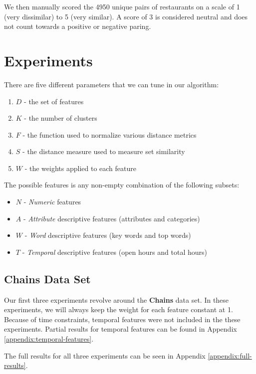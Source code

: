 \documentclass{article}
\begin{document}
      We then manually scored the 4950 unique pairs of restaurants on a scale of 1 (very dissimilar) to 5 (very similar).
      A score of 3 is considered neutral and does not count towards a positive or negative paring.

\section{Experiments}

   There are five different parameters that we can tune in our algorithm:
   \begin{enumerate}
      \item $D$ - the set of features
      \item $K$ - the number of clusters
      \item $F$ - the function used to normalize various distance metrics
      \item $S$ - the distance measure used to measure set similarity
      \item $W$ - the weights applied to each feature
   \end{enumerate}

   The possible features is any non-empty combination of the following subsets:
   \begin{itemize}
      \item $N$ - \textit{Numeric} features
      \item $A$ - \textit{Attribute} descriptive features (attributes and categories)
      \item $W$ - \textit{Word} descriptive features (key words and top words)
      \item $T$ - \textit{Temporal} descriptive features (open hours and total hours)
   \end{itemize}

   \subsection{Chains Data Set}
      Our first three experiments revolve around the \textbf{Chains} data set.
      In these experiments, we will always keep the weight for each feature constant at 1.
      Because of time constraints, temporal features were not included in the these experiments.
      Partial results for temporal features can be found in Appendix \ref{appendix:temporal-features}.

      The full results for all three experiments can be seen in Appendix \ref{appendix:full-results}.
\end{document}
